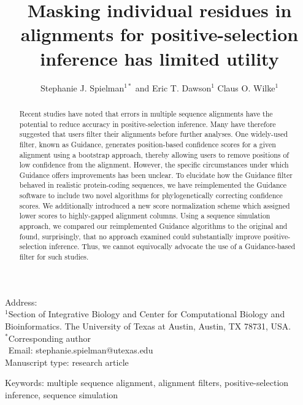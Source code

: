 \documentclass[10pt]{article}
\begin{document}
\title{\textbf{Masking individual residues in alignments for positive-selection inference has limited utility}}
\author{Stephanie J. Spielman$^{1*}$ and Eric T. Dawson$^{1}$ Claus O. Wilke$^{1}$}
\date{}

\maketitle
\noindent
Address:\\
$^1$Section of Integrative Biology and Center for Computational Biology and Bioinformatics. The University
of Texas at Austin, Austin, TX 78731, USA.\\

\bigskip
\noindent
$^*$Corresponding author\\
$\phantom{^*}$Email: stephanie.spielman@utexas.edu\\

\bigskip
\noindent
Manuscript type: research article

\bigskip
\noindent Keywords: multiple sequence alignment, alignment filters, positive-selection inference, sequence simulation

\newpage
\begin{abstract}
 Recent studies have noted that errors in multiple sequence alignments have the potential to reduce accuracy in positive-selection inference. Many have therefore suggested that users filter their alignments before further analyses. One widely-used filter, known as Guidance, generates position-based confidence scores for a given alignment using a bootstrap approach, thereby allowing users to remove positions of low confidence from the alignment. However, the specific circumstances under which Guidance offers improvements has been unclear. To elucidate how the Guidance filter behaved in realistic protein-coding sequences, we have reimplemented the Guidance software to include two novel algorithms for phylogenetically correcting confidence scores. We additionally introduced a new score normalization scheme which assigned lower scores to highly-gapped alignment columns. Using a sequence simulation approach, we compared our reimplemented Guidance algorithms to the original and found, surprisingly, that no approach examined could substantially improve positive-selection inference. Thus, we cannot equivocally advocate the use of a Guidance-based filter for such studies.
\end{abstract}
\end{document}
